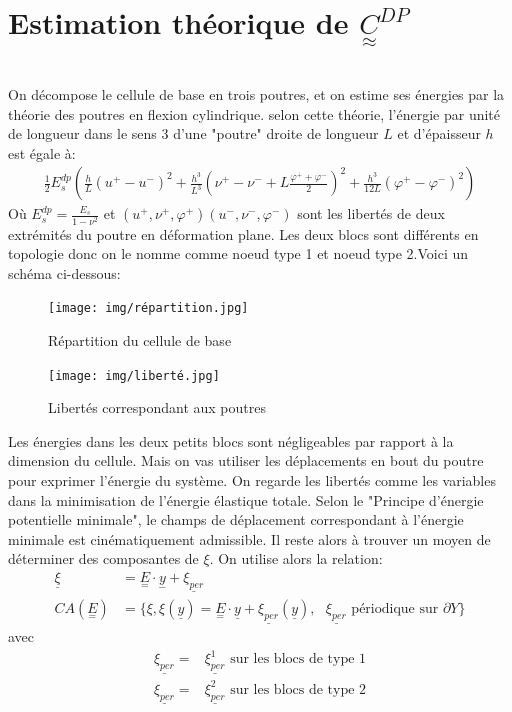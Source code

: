 \documentclass{article}
\begin{document}
\section{Estimation théorique de $\underset{\approx}{C}^{DP}$}\leavevmode\\
On décompose le cellule de base en trois poutres, et on estime ses énergies par la théorie des poutres en flexion cylindrique. selon cette théorie, l'énergie par unité de longueur dans le sens 3 d'une "poutre" droite de longueur $L$ et d'épaisseur $h$ est égale à:\\
\begin{align*}
    \frac{1}{2}E_{s}^{dp}(\frac{h}{L}(u^{+}-u^{-})^{2}+\frac{h^{3}}{L^{3}}(\nu^{+}-\nu^{-}+L\frac{\varphi^{+}+\varphi^{-}}{2})^{2}+\frac{h^{3}}{12L}(\varphi^{+}-\varphi^{-})^{2})
\end{align*}
Où $E_{s}^{dp}=\frac{E_{s}}{1-\nu^{2}}$ et $(u^{+},\nu^{+},\varphi^{+})(u^{-},\nu^{-},\varphi^{-})$ sont les libertés de deux extrémités du poutre en déformation plane. Les deux blocs sont différents en topologie donc on le nomme comme noeud type 1 et noeud type 2.Voici un schéma ci-dessous:\\
\begin{figure}[H]
    \begin{center}
    \texttt{[image: img/répartition.jpg]}
    \end{center}
    \caption{Répartition du cellule de base}
    \label{fig_répartition}
\end{figure}
\begin{figure}[H]
    \begin{center}
    \texttt{[image: img/liberté.jpg]}
    \end{center}
    \caption{Libertés correspondant aux poutres}
    \label{fig_liberté}
\end{figure}
\par
Les énergies dans les deux petits blocs sont négligeables par rapport à la dimension du cellule. Mais on vas utiliser les déplacements en bout du poutre pour exprimer l'énergie du système. On regarde les libertés comme les variables dans la minimisation de l'énergie élastique totale. Selon le "Principe d'énergie potentielle minimale", le champs de déplacement correspondant à l'énergie minimale est cinématiquement admissible. Il reste alors à trouver un moyen de déterminer des composantes de $\xi$. On utilise alors la relation:\\
\begin{align*}
    \underline{\xi}&=\underset{=}{E}\cdot\underset{-}{y}+\underline{\xi_{per}}\\
    CA(\underset{=}{E})&=\bigl\{\xi,\xi(\underline{y})=\underset{=}{E}\cdot\underline{y}+\underline{\xi_{per}}(\underline{y}),\text{ $\underline{\xi_{per}}$ périodique sur $\partial Y$} \bigr\}
\end{align*}
avec
\begin{align*}
    \underline{\xi_{per}}={}& \underline{\xi_{per}^{1}}\text{ sur les blocs de type 1} \\
    \underline{\xi_{per}}={}& \underline{\xi_{per}^{2}}\text{ sur les blocs de type 2} 
\end{align*}
\end{document}
